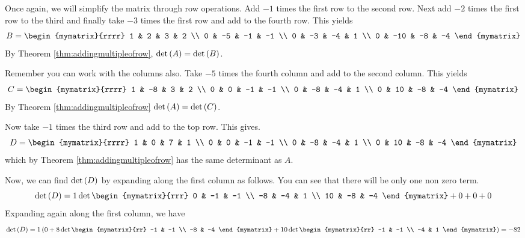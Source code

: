 \begin{solution} 
Once again, we will simplify the matrix through row operations. 
Add $-1$ times the first row to
the second row. Next add $-2$ times the first row to the third and finally take
$-3$ times the first row and add to the fourth row. This yields
\begin{equation*}
B = \begin{mymatrix}{rrrr}
1 & 2 & 3 & 2 \\
0 & -5 & -1 & -1 \\
0 & -3 & -4 & 1 \\
0 & -10 & -8 & -4
\end{mymatrix} 
\end{equation*}
By Theorem \ref{thm:addingmultipleofrow}, $\det \left(A\right) = \det \left(B\right)$. 

Remember you can work with the columns also. Take $-5$
times the fourth column and add to the second column. This yields
\begin{equation*}
C = \begin{mymatrix}{rrrr}
1 & -8 & 3 & 2 \\
0 & 0 & -1 & -1 \\
0 & -8 & -4 & 1 \\
0 & 10 & -8 & -4
\end{mymatrix}
\end{equation*}
By Theorem \ref{thm:addingmultipleofrow} $\det \left(A\right) = \det \left(C\right)$. 

Now take $-1$ times the third row and add to
the top row. This gives.
\begin{equation*}
D = \begin{mymatrix}{rrrr}
1 & 0 & 7 & 1 \\
0 & 0 & -1 & -1 \\
0 & -8 & -4 & 1 \\
0 & 10 & -8 & -4
\end{mymatrix}
\end{equation*}
which by Theorem \ref{thm:addingmultipleofrow} has the same determinant as $A$.

Now, we can find $\det \left(D\right)$ by expanding along the first column as follows. You can see that there will be only one non zero term.
\begin{equation*}
\det \tup{D} = 1 \det \begin{mymatrix}{rrr}
0 & -1 & -1 \\
-8 & -4 & 1 \\
10 & -8 & -4
\end{mymatrix}
+ 0 + 0 + 0 
\end{equation*}
Expanding again along the first column, we have
\begin{equation*}
\det \tup{D} 
=
1 \tup{0 +  8\det \begin{mymatrix}{rr}
-1 & -1 \\
-8 & -4
\end{mymatrix} +10\det \begin{mymatrix}{rr}
-1 & -1 \\
-4 & 1
\end{mymatrix} } = -82
\end{equation*}


\end{solution}
